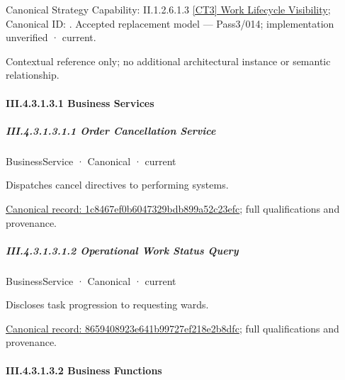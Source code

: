 {\small Canonical Strategy Capability: II.1.2.6.1.3 \hyperref[element:5239aba7e072422686d108950a5b0d50]{[CT3] Work Lifecycle Visibility}; Canonical ID: \texttt{}. Accepted replacement model — Pass3/014; implementation unverified · current.}\par
Contextual reference only; no additional architectural instance or semantic relationship.\par
\paragraph*{III.4.3.1.3.1 Business Services}
\label{navigation:III.4.3.1.3.1}

\subparagraph*{III.4.3.1.3.1.1 Order Cancellation Service}
\label{navigation:III.4.3.1.3.1.1}

\label{element:1c8467ef0b6047329bdb899a52c23efc}
{\small BusinessService · Canonical · current}\par

Dispatches cancel directives to performing systems.


{\footnotesize \href{../../../../continuum/business/business-service/1c8467ef0b6047329bdb899a52c23efc.md}{Canonical record: 1c8467ef0b6047329bdb899a52c23efc}; full qualifications and provenance.}\par
\subparagraph*{III.4.3.1.3.1.2 Operational Work Status Query}
\label{navigation:III.4.3.1.3.1.2}

\label{element:8659408923e641b99727ef218e2b8dfc}
{\small BusinessService · Canonical · current}\par

Discloses task progression to requesting wards.


{\footnotesize \href{../../../../continuum/business/business-service/8659408923e641b99727ef218e2b8dfc.md}{Canonical record: 8659408923e641b99727ef218e2b8dfc}; full qualifications and provenance.}\par
\paragraph*{III.4.3.1.3.2 Business Functions}
\label{navigation:III.4.3.1.3.2}

